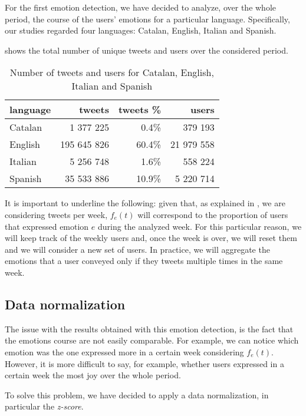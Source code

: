 For the first emotion detection, we have decided to analyze, over the whole period, the course of the users' emotions for a particular language. Specifically, our studies regarded four languages: Catalan, English, Italian and Spanish.

 shows the total number of unique tweets and users over the considered period.

\begin{table}[h]
	\centering
	\begin{tabular}{lrrr}
		\toprule
		\textbf{language} & \textbf{tweets} & \textbf{tweets \%} & \textbf{users}
		\\
		\midrule
		Catalan & 1 377 225 & 0.4\% & 379 193
		\\
		English & 195 645 826 & 60.4\% & 21 979 558 
		\\
		Italian & 5 256 748 & 1.6\% & 558 224
		\\
		Spanish & 35 533 886 & 10.9\% & 5 220 714
		\\
		\bottomrule
	\end{tabular}
	\caption{Number of tweets and users for Catalan, English, Italian and Spanish}
	\label{tab:tweet-languages}
\end{table}

It is important to underline the following: given that, as explained in , we are considering tweets per week, \(f_e(t)\) will correspond to the proportion of users that expressed emotion \(e\) during the analyzed week. For this particular reason, we will keep track of the weekly users and, once the week is over, we will reset them and we will consider a new set of users. In practice, we will aggregate the emotions that a user conveyed only if they tweets multiple times in the same week. 

\subsection{Data normalization}
\label{subsec:normalization}

The issue with the results obtained with this emotion detection, is the fact that the emotions course are not easily comparable. For example, we can notice which emotion was the one expressed more in a certain week considering \(f_e(t)\). However, it is more difficult to say, for example, whether users expressed in a certain week the most joy over the whole period.

To solve this problem, we have decided to apply a data normalization, in particular the \textit{z-score}.

